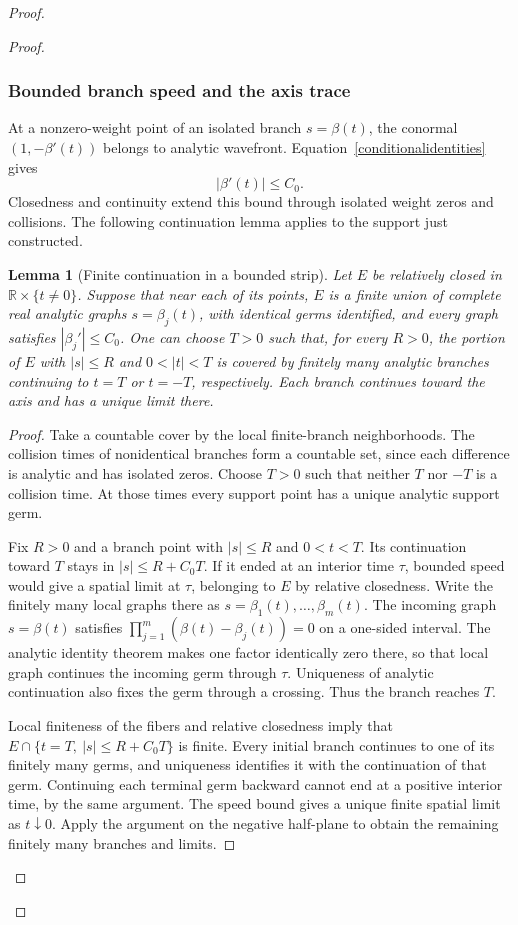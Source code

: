 \documentclass[11pt]{article}
\newtheorem{lemma}[theorem]{Lemma}
\newcommand{\R}{\mathbb R}
\begin{document}
\begin{proof}
\begin{proof}
\subsubsection{Bounded branch speed and the axis trace}
At a nonzero-weight point of an isolated branch $s=\beta(t)$, the conormal $(1,-\beta'(t))$ belongs to analytic wavefront. Equation~\eqref{conditionalidentities} gives
\begin{equation}\label{branchspeed}
 |\beta'(t)|\le C_0.
\end{equation}
Closedness and continuity extend this bound through isolated weight zeros and collisions. The following continuation lemma applies to the support just constructed.

\begin{lemma}[Finite continuation in a bounded strip]\label{lem:finitecontinuation}
Let $E$ be relatively closed in $\R\times\{t\ne0\}$. Suppose that near each of its points, $E$ is a finite union of complete real analytic graphs $s=\beta_j(t)$, with identical germs identified, and every graph satisfies $|\beta_j'|\le C_0$. One can choose $T>0$ such that, for every $R>0$, the portion of $E$ with $|s|\le R$ and $0<|t|<T$ is covered by finitely many analytic branches continuing to $t=T$ or $t=-T$, respectively. Each branch continues toward the axis and has a unique limit there.
\end{lemma}
\begin{proof}
Take a countable cover by the local finite-branch neighborhoods. The collision times of nonidentical branches form a countable set, since each difference is analytic and has isolated zeros. Choose $T>0$ such that neither $T$ nor $-T$ is a collision time. At those times every support point has a unique analytic support germ.

Fix $R>0$ and a branch point with $|s|\le R$ and $0<t<T$. Its continuation toward $T$ stays in $|s|\le R+C_0T$. If it ended at an interior time $\tau$, bounded speed would give a spatial limit at $\tau$, belonging to $E$ by relative closedness. Write the finitely many local graphs there as $s=\beta_1(t),\ldots,\beta_m(t)$. The incoming graph $s=\beta(t)$ satisfies $\prod_{j=1}^m(\beta(t)-\beta_j(t))=0$ on a one-sided interval. The analytic identity theorem makes one factor identically zero there, so that local graph continues the incoming germ through $\tau$. Uniqueness of analytic continuation also fixes the germ through a crossing. Thus the branch reaches $T$.

Local finiteness of the fibers and relative closedness imply that $E\cap\{t=T,\ |s|\le R+C_0T\}$ is finite. Every initial branch continues to one of its finitely many germs, and uniqueness identifies it with the continuation of that germ. Continuing each terminal germ backward cannot end at a positive interior time, by the same argument. The speed bound gives a unique finite spatial limit as $t\downarrow0$. Apply the argument on the negative half-plane to obtain the remaining finitely many branches and limits.
\end{proof}


\end{proof}
\end{proof}
\end{document}
